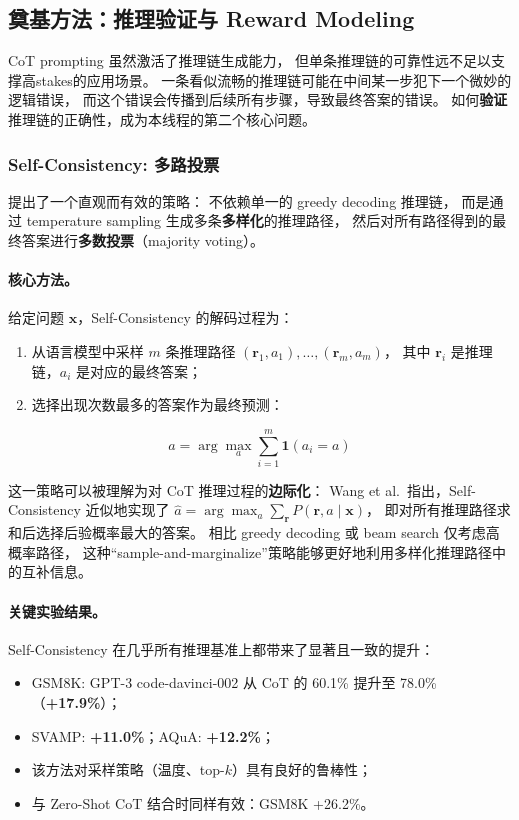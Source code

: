 \subsection{奠基方法：推理验证与 Reward Modeling}
\label{sec:t4-foundation}

CoT prompting 虽然激活了推理链生成能力，
但单条推理链的可靠性远不足以支撑高stakes的应用场景。
一条看似流畅的推理链可能在中间某一步犯下一个微妙的逻辑错误，
而这个错误会传播到后续所有步骤，导致最终答案的错误。
如何\textbf{验证}推理链的正确性，成为本线程的第二个核心问题。

\subsubsection{Self-Consistency: 多路投票}
\label{sec:t4-self-consistency}

 提出了一个直观而有效的策略：
不依赖单一的 greedy decoding 推理链，
而是通过 temperature sampling 生成多条\textbf{多样化}的推理路径，
然后对所有路径得到的最终答案进行\textbf{多数投票}（majority voting）。

\paragraph{核心方法。}
给定问题 $\mathbf{x}$，Self-Consistency 的解码过程为：
\begin{enumerate}[leftmargin=2em]
  \item 从语言模型中采样 $m$ 条推理路径 $(\mathbf{r}_1, a_1), \ldots, (\mathbf{r}_m, a_m)$，
    其中 $\mathbf{r}_i$ 是推理链，$a_i$ 是对应的最终答案；
  \item 选择出现次数最多的答案作为最终预测：
\end{enumerate}
\begin{equation}
\label{eq:self-consistency}
\hat{a} = \arg\max_{a} \sum_{i=1}^{m} \mathbf{1}(a_i = a)
\end{equation}

\noindent
这一策略可以被理解为对 CoT 推理过程的\textbf{边际化}：
Wang et al.\ 指出，Self-Consistency 近似地实现了
$\hat{a} = \arg\max_a \sum_{\mathbf{r}} P(\mathbf{r}, a \mid \mathbf{x})$，
即对所有推理路径求和后选择后验概率最大的答案。
相比 greedy decoding 或 beam search 仅考虑高概率路径，
这种``sample-and-marginalize''策略能够更好地利用多样化推理路径中的互补信息。

\paragraph{关键实验结果。}
Self-Consistency 在几乎所有推理基准上都带来了显著且一致的提升：
\begin{itemize}[leftmargin=2em]
  \item GSM8K: GPT-3 code-davinci-002 从 CoT 的 60.1\% 提升至 78.0\%（\textbf{+17.9\%}）；
  \item SVAMP: \textbf{+11.0\%}；AQuA: \textbf{+12.2\%}；
  \item 该方法对采样策略（温度、top-$k$）具有良好的鲁棒性；
  \item 与 Zero-Shot CoT 结合时同样有效：GSM8K +26.2\%。
\end{itemize}

